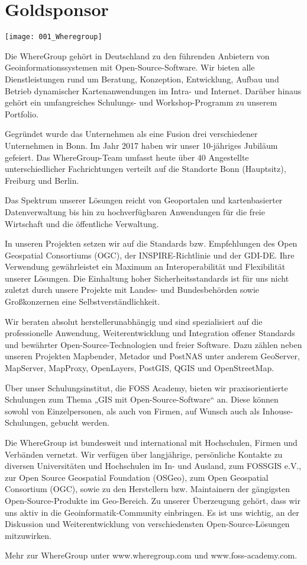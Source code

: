 \section*{Goldsponsor}
\begin{center}
	\texttt{[image: 001\_Wheregroup]}
\end{center}
Die WhereGroup gehört in Deutschland zu den führenden Anbietern von Geoinformationssystemen mit
Open-Source-Software. Wir bieten alle Dienstleistungen rund um Beratung, Konzeption, Entwicklung,
Aufbau und Betrieb dynamischer Kartenanwendungen im Intra- und Internet. Darüber hinaus gehört ein
umfangreiches Schulungs- und Workshop-Programm zu unserem Portfolio.

Gegründet wurde das Unternehmen als eine Fusion drei verschiedener Unternehmen in Bonn. Im Jahr 2017
haben wir unser 10-jähriges Jubiläum gefeiert. Das WhereGroup-Team umfasst heute über 40 Angestellte
unterschiedlicher Fachrichtungen verteilt auf die Standorte Bonn (Hauptsitz), Freiburg und Berlin.

Das Spektrum unserer Lösungen reicht von Geoportalen und kartenbasierter Datenverwaltung bis hin zu
hochverfügbaren Anwendungen für die freie Wirtschaft und die öffentliche Verwaltung.

In unseren Projekten setzen wir auf die Standards bzw. Empfehlungen des Open Geospatial Consortiums
(OGC), der INSPIRE-Richtlinie und der GDI-DE. Ihre Verwendung gewährleistet ein Maximum an
Interoperabilität und Flexibilität unserer Lösungen. Die Einhaltung hoher Sicherheitsstandards ist
für uns nicht zuletzt durch unsere Projekte mit Landes- und Bundesbehörden sowie Großkonzernen eine
Selbstverständlichkeit.

Wir beraten absolut herstellerunabhängig und sind spezialisiert auf die professionelle Anwendung,
Weiterentwicklung und Integration offener Standards und bewährter Open-Source-Technologien und
freier Software. Dazu zählen neben unseren Projekten Mapbender, Metador und PostNAS unter anderem
GeoServer, MapServer, MapProxy, OpenLayers, PostGIS, QGIS und OpenStreetMap.

Über unser Schulungsinstitut, die FOSS Academy, bieten wir praxisorientierte Schulungen zum Thema
„GIS mit Open-Source-Software“ an. Diese können sowohl von Einzelpersonen, als auch von Firmen, auf
Wunsch auch als Inhouse-Schulungen, gebucht werden.

Die WhereGroup ist bundesweit und international mit Hochschulen, Firmen und Verbänden vernetzt. Wir
verfügen über langjährige, persönliche Kontakte zu diversen Universitäten und Hochschulen im In- und
Ausland, zum FOSSGIS e.V., zur Open Source Geospatial Foundation (OSGeo), zum Open Geospatial
Consortium (OGC), sowie zu den Herstellern bzw. Maintainern der gängigsten Open-Source-Produkte im
Geo-Bereich. Zu unserer Überzeugung gehört, dass wir uns aktiv in die Geoinformatik-Community
einbringen. Es ist uns wichtig, an der Diskussion und Weiterentwicklung von verschiedensten
Open-Source-Lösungen mitzuwirken.

Mehr zur WhereGroup unter www.wheregroup.com und www.foss-academy.com.
